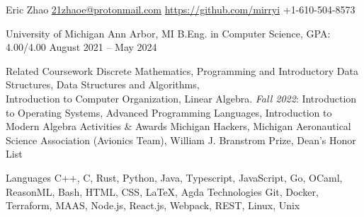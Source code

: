 \documentclass[letterpaper,11pt]{article}
\begin{document}
\rheading
  {Eric Zhao}
  {\href{mailto:21zhaoe@protonmail.com}{21zhaoe@protonmail.com}}
  {\href{https://github.com/mirryi}{https://github.com/mirryi}}
  {+1-610-504-8573}

  \begin{rsectionlist}
    \rsectionitem%
      {University of Michigan}
      {Ann Arbor, MI}
      {B.Eng. in Computer Science, GPA: 4.00/4.00}
      {August 2021 -- May 2024}
      \begin{rpointlist}
        \rpoint
          {Related Coursework}
          {Discrete Mathematics, Programming and Introductory Data Structures, Data Structures and
            Algorithms, \\ Introduction to Computer Organization, Linear Algebra.
            \emph{Fall 2022}: Introduction to Operating Systems, Advanced Programming Languages,
            Introduction to Modern Algebra}
        \rpoint
          {Activities \& Awards}
          {Michigan Hackers, Michigan Aeronautical Science Association (Avionics Team), William J.
            Branstrom Prize, Dean's Honor List}
      \end{rpointlist}
  \end{rsectionlist}

  \begin{rlinelist}
    \rline
      {Languages}
      {C++, C, Rust, Python, Java, Typescript, JavaScript, Go, OCaml, ReasonML, Bash, HTML, CSS,
        \LaTeX, Agda}
    \rline
      {Technologies}
      {Git, Docker, Terraform, MAAS, Node.js, React.js, Webpack, REST, Linux, Unix}
  \end{rlinelist}
\end{document}
